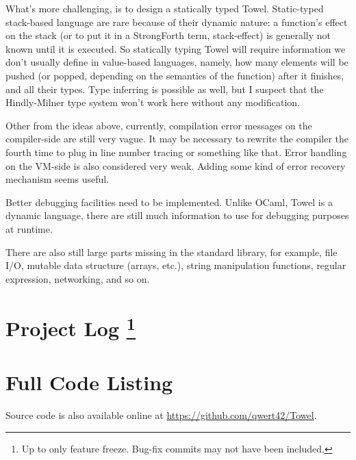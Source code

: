 \documentclass{report}
\begin{document}
What's more challenging, is to design a statically typed Towel. Static-typed stack-based language are rare because of their dynamic nature: a function's effect on the stack (or to put it in a StrongForth term, stack-effect) is generally not known until it is executed. So statically typing Towel will require information we don't usually define in value-based languages, namely, how many elements will be pushed (or popped, depending on the semantics of the function) after it finishes, and all their types. Type inferring is possible as well, but I suspect that the Hindly-Milner type system won't work here without any modification.

Other from the ideas above, currently, compilation error messages on the compiler-side are still very vague. It may be necessary to rewrite the compiler the fourth time to plug in line number tracing or something like that. Error handling on the VM-side is also considered very weak. Adding some kind of error recovery mechanism seems useful.

Better debugging facilities need to be implemented. Unlike OCaml, Towel is a dynamic language, there are still much information to use for debugging purposes at runtime.

There are also still large parts missing in the standard library, for example, file I/O, mutable data structure (arrays, etc.), string manipulation functions, regular expression, networking, and so on.

\begin{appendices}
\chapter[Project Log]{Project Log \footnote{Up to only feature freeze. Bug-fix commits may not have been included.}}
\label{project-log}



\chapter{Full Code Listing}

\begin{mdframed}[style=hint]
  Source code is also available online at \url{https://github.com/qwert42/Towel}.
\end{mdframed}



\end{appendices}
\end{document}

